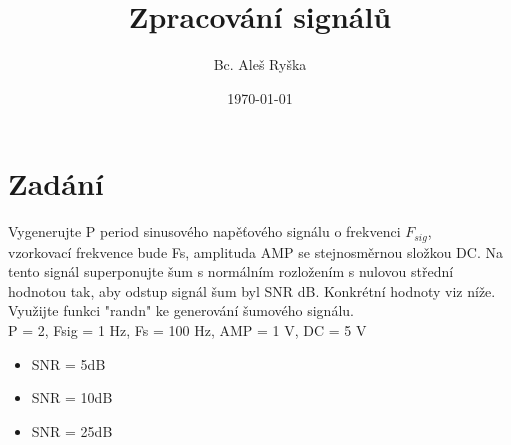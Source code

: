 \documentclass{article}
\title{Zpracování signálů} %
\author{Bc. Aleš Ryška} %
\date{\today} %
\begin{document}
\maketitle %



\section{Zadání}
Vygenerujte P period sinusového napěťového signálu o frekvenci $F_{sig}$,\\
vzorkovací frekvence bude Fs, amplituda AMP se stejnosměrnou složkou DC. Na tento signál superponujte šum s normálním rozložením s nulovou střední hodnotou tak, aby odstup signál šum byl SNR dB. Konkrétní hodnoty viz níže. 
\\
Využijte funkci "randn" ke generování šumového signálu.
\\
P = 2, Fsig = 1 Hz, Fs = 100 Hz, AMP = 1 V, DC = 5 V \\

\begin{itemize}
	\item SNR = 5dB
	\item SNR = 10dB
	\item SNR = 25dB
\end{itemize}
\end{document}
